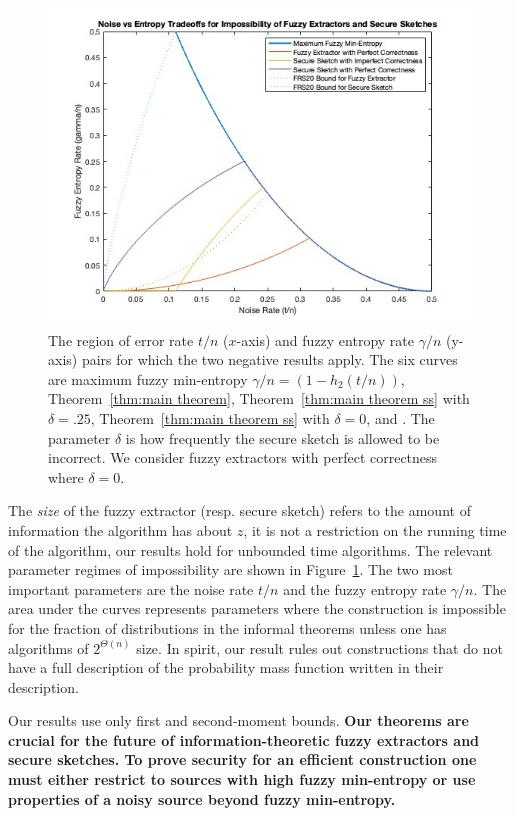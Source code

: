 \begin{figure}[t]
\centering
\includegraphics[width=.9\textwidth]{EntropyvsError.jpg}
\caption{The region of error rate $t/n$ ($x$-axis) and fuzzy entropy rate $\gamma/n$ (y-axis) pairs for which the two negative results apply.  The six curves are maximum fuzzy min-entropy $\gamma/n = (1-h_2(t/n))$, Theorem~\ref{thm:main theorem}, Theorem~\ref{thm:main theorem ss} with $\delta=.25$,  Theorem~\ref{thm:main theorem ss} with $\delta =0$, \cite[Theorem 5.1]{fuller2020fuzzy} and \cite[Theorem 7.2]{fuller2020fuzzy}. The parameter $\delta$ is how frequently the secure sketch is allowed to be incorrect.  We consider fuzzy extractors with perfect correctness where $\delta=0$.}
\label{fig:param regime}
\end{figure}
The \emph{size} of the fuzzy extractor (resp. secure sketch) refers to the amount of information the algorithm has about $z$, it is not a restriction on the running time of the algorithm, our results hold for unbounded time algorithms. 
 The relevant parameter regimes of impossibility are shown in Figure~\ref{fig:param regime}.  The two most important parameters are the noise rate $t/n$ and the fuzzy entropy rate $\gamma/n$. The area under the curves represents parameters where the construction is impossible for the fraction of distributions in the informal theorems unless one has algorithms of $2^{\Theta(n)}$ size.
In spirit, our result rules out constructions that do not have a full description of the probability mass function written in their description.  

Our results use only first and second-moment bounds.    \textbf{Our theorems are crucial for the future of information-theoretic fuzzy extractors and secure sketches.  To prove security for an efficient construction one must either restrict to sources with high fuzzy min-entropy or use properties of a noisy source beyond fuzzy min-entropy.}  %


